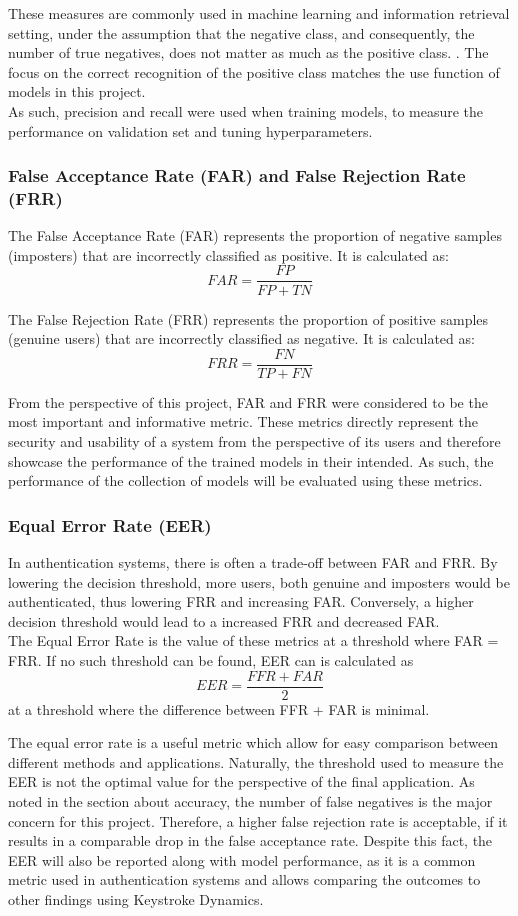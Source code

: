 These measures are commonly used in machine learning and information retrieval setting, under the assumption that the negative class, and consequently, the number of true negatives, does not matter as much as the positive class. . The focus on the correct recognition of the positive class matches the use function of models in this project.\\
As such, precision and recall were used when training models, to measure the performance on validation set and tuning hyperparameters.

\subsubsection{False Acceptance Rate (FAR) and False Rejection Rate (FRR)}
The False Acceptance Rate (FAR) represents the proportion of negative samples (imposters) that are incorrectly classified as positive. It is calculated as:
\[
FAR = \frac{FP}{FP + TN}
\]

The False Rejection Rate (FRR) represents the proportion of positive samples (genuine users) that are incorrectly classified as negative. It is calculated as:
\[
FRR = \frac{FN}{TP + FN}
\]

From the perspective of this project, FAR and FRR were considered to be the most important and informative metric. These metrics directly represent the security and usability of a system from the perspective of its users and therefore showcase the performance of the trained models in their intended. As such, the performance of the collection of models will be evaluated using these metrics. 

\subsubsection{Equal Error Rate (EER)}
In authentication systems, there is often a trade-off between FAR and FRR. By lowering the decision threshold, more users, both genuine and imposters would be authenticated, thus lowering FRR and increasing FAR. Conversely, a higher decision threshold would lead to a increased FRR and decreased FAR. \\
The Equal Error Rate is the value of these metrics at a threshold where FAR = FRR. If no such threshold can be found, EER can is calculated as  
\[
EER = \frac{FFR + FAR}{2}
\]
at a threshold where the difference between FFR + FAR is minimal.

The equal error rate is a useful metric which allow for easy comparison between different methods and applications. Naturally, the threshold used to measure the EER is not the optimal value for the perspective of the final application. As noted in the section about accuracy, the number of false negatives is the major concern for this project. Therefore, a higher false rejection rate is acceptable, if it results in a comparable drop in the false acceptance rate. Despite this fact, the EER will also be reported along with model performance, as it is a common metric used in authentication systems and allows comparing the outcomes to other findings using Keystroke Dynamics.

